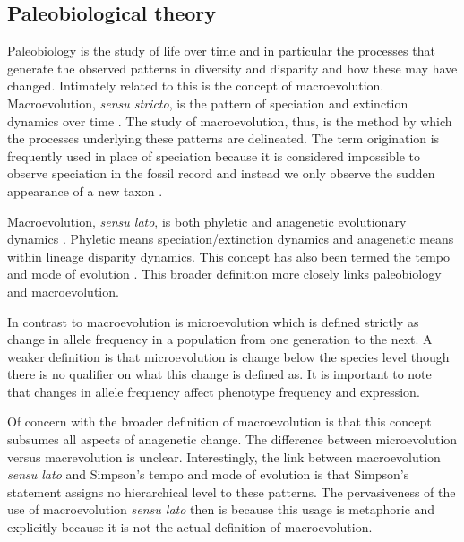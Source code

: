 \documentclass[12pt,letterpaper]{article}
\begin{document}
\subsection{Paleobiological theory}

Paleobiology is the study of life over time and in particular the processes that generate the observed patterns in diversity and disparity and how these may have changed.  %
Intimately related to this is the concept of macroevolution. Macroevolution, \textit{sensu stricto}, is the pattern of speciation and extinction dynamics over time \citep{Jablonski2008a}. The study of macroevolution, thus, is the method by which the processes underlying these patterns are delineated. The term origination is frequently used in place of speciation because it is considered impossible to observe speciation in the fossil record and instead we only observe the sudden appearance of a new taxon \citep{Coyne2004}.

Macroevolution, \textit{sensu lato}, is both phyletic and anagenetic evolutionary dynamics \citep{Foote2007b}. Phyletic means speciation/extinction dynamics and anagenetic means within lineage disparity dynamics. This concept has also been termed the tempo and mode of evolution \citep{Simpson1944}. This broader definition more closely links paleobiology and macroevolution.

In contrast to macroevolution is microevolution \citep{Simpson1944,Foote2007b} which is defined strictly as change in allele frequency in a population from one generation to the next. A weaker definition is that microevolution is change below the species level \citep{Foote2007b} though there is no qualifier on what this change is defined as. It is important to note that changes in allele frequency affect phenotype frequency and expression.


Of concern with the broader definition of macroevolution is that this concept subsumes all aspects of anagenetic change. The difference between microevolution versus macrevolution is unclear. Interestingly, the link between macroevolution \textit{sensu lato} and Simpson's tempo and mode of evolution is that Simpson's statement assigns no hierarchical level to these patterns. The pervasiveness of the use of macroevolution \textit{sensu lato} then is because this usage is metaphoric and explicitly because it is not the actual definition of macroevolution.
\end{document}
